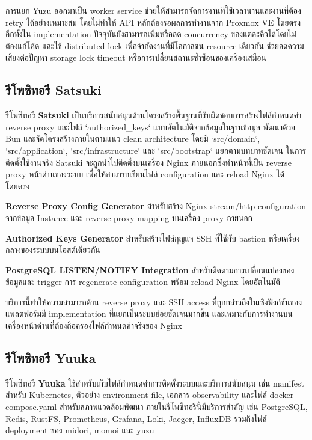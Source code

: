 \hspace*{1.3em}
การแยก Yuzu ออกมาเป็น worker service ช่วยให้สามารถจัดการงานที่ใช้เวลานานและงานที่ต้อง retry ได้อย่างเหมาะสม โดยไม่ทำให้ API หลักต้องรอผลการทำงานจาก Proxmox VE โดยตรง อีกทั้งใน implementation ปัจจุบันยังสามารถเพิ่มหรือลด concurrency ของแต่ละคิวได้โดยไม่ต้องแก้โค้ด และใช้ distributed lock เพื่อจำกัดงานที่มีโอกาสชน resource เดียวกัน ช่วยลดความเสี่ยงต่อปัญหา storage lock timeout หรือการเปลี่ยนสถานะซ้ำซ้อนของเครื่องเสมือน

\subsection{รีโพซิทอรี Satsuki}
\hspace*{1.3em}
รีโพซิทอรี \textbf{Satsuki} เป็นบริการสนับสนุนด้านโครงสร้างพื้นฐานที่รับผิดชอบการสร้างไฟล์กำหนดค่า reverse proxy และไฟล์ `authorized\_keys` แบบอัตโนมัติจากข้อมูลในฐานข้อมูล พัฒนาด้วย Bun และจัดโครงสร้างภายในตามแนว clean architecture โดยมี `src/domain`, `src/application`, `src/infrastructure` และ `src/bootstrap` แยกตามบทบาทชัดเจน ในการติดตั้งใช้งานจริง Satsuki จะถูกนำไปติดตั้งบนเครื่อง Nginx ภายนอกซึ่งทำหน้าที่เป็น reverse proxy หน้าด่านของระบบ เพื่อให้สามารถเขียนไฟล์ configuration และ reload Nginx ได้โดยตรง
\begin{mycustomenum2}
    \item \textbf{Reverse Proxy Config Generator} สำหรับสร้าง Nginx stream/http configuration จากข้อมูล Instance และ reverse proxy mapping บนเครื่อง proxy ภายนอก
    \item \textbf{Authorized Keys Generator} สำหรับสร้างไฟล์กุญแจ SSH ที่ใช้กับ bastion หรือเครื่องกลางของระบบบนโฮสต์เดียวกัน
    \item \textbf{PostgreSQL LISTEN/NOTIFY Integration} สำหรับติดตามการเปลี่ยนแปลงของข้อมูลและ trigger การ regenerate configuration พร้อม reload Nginx โดยอัตโนมัติ
\end{mycustomenum2}
\hspace*{1.3em}
บริการนี้ทำให้ความสามารถด้าน reverse proxy และ SSH access ที่ถูกกล่าวถึงในเชิงฟังก์ชันของแพลตฟอร์มมี implementation ที่แยกเป็นระบบย่อยชัดเจนมากขึ้น และเหมาะกับการทำงานบนเครื่องหน้าด่านที่ต้องถือครองไฟล์กำหนดค่าจริงของ Nginx

\subsection{รีโพซิทอรี Yuuka}
\hspace*{1.3em}
รีโพซิทอรี \textbf{Yuuka} ใช้สำหรับเก็บไฟล์กำหนดค่าการติดตั้งระบบและบริการสนับสนุน เช่น manifest สำหรับ Kubernetes, ตัวอย่าง environment file, เอกสาร observability และไฟล์ docker-compose.yaml สำหรับสภาพแวดล้อมพัฒนา ภายในรีโพซิทอรีนี้มีบริการสำคัญ เช่น PostgreSQL, Redis, RustFS, Prometheus, Grafana, Loki, Jaeger, InfluxDB รวมถึงไฟล์ deployment ของ midori, momoi และ yuzu


